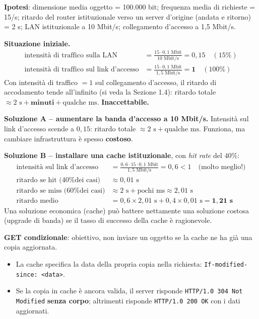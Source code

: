 \documentclass[12pt, a4paper]{article}
\begin{document}
\begin{tcolorbox}[colback=orange!5, colframe=orange!70!black, title=\textbf{Esercizio 2.2 -- Dimensionare l'accesso a Internet con e senza cache}]
\textbf{Ipotesi}: dimensione media oggetto = 100.000 bit; frequenza media di richieste = 15/s; ritardo del router istituzionale verso un server d'origine (andata e ritorno) = 2 s; LAN istituzionale a 10 Mbit/s; collegamento d'accesso a 1,5 Mbit/s.

\textbf{Situazione iniziale.}
\begin{align*}
\text{intensità di traffico sulla LAN} &= \frac{15 \cdot 0{,}1\text{ Mbit}}{10\text{ Mbit/s}} = 0{,}15 \quad (15\%) \\
\text{intensità di traffico sul link d'accesso} &= \frac{15 \cdot 0{,}1\text{ Mbit}}{1{,}5\text{ Mbit/s}} = \mathbf{1} \quad (100\%)
\end{align*}
Con intensità di traffico $=1$ sul collegamento d'accesso, il ritardo di accodamento tende all'infinito (si veda la Sezione 1.4): ritardo totale $\approx 2\text{ s} + \textbf{minuti} + \text{qualche ms}$. \textbf{Inaccettabile.}

\textbf{Soluzione A -- aumentare la banda d'accesso a 10 Mbit/s.} Intensità sul link d'accesso scende a $0{,}15$: ritardo totale $\approx 2\text{ s} + \text{qualche ms}$. Funziona, ma cambiare infrastruttura è spesso \textbf{costoso}.

\textbf{Soluzione B -- installare una cache istituzionale}, con \textit{hit rate} del $40\%$:
\begin{align*}
\text{intensità sul link d'accesso} &= \frac{0{,}6 \cdot 15 \cdot 0{,}1\text{ Mbit}}{1{,}5\text{ Mbit/s}} = 0{,}6 < 1 \quad \text{(molto meglio!)} \\
\text{ritardo se hit (40\% dei casi)} &\approx 0{,}01\text{ s} \\
\text{ritardo se miss (60\% dei casi)} &\approx 2\text{ s} + \text{pochi ms} \approx 2{,}01\text{ s} \\
\text{ritardo medio} &= 0{,}6 \times 2{,}01\text{ s} + 0{,}4 \times 0{,}01\text{ s} = \mathbf{1{,}21\text{ s}}
\end{align*}
Una soluzione economica (cache) può battere nettamente una soluzione costosa (upgrade di banda) se il tasso di successo della cache è ragionevole.
\end{tcolorbox}

\textbf{GET condizionale}: obiettivo, non inviare un oggetto se la cache ne ha già una copia aggiornata.
\begin{itemize}
    \item La cache specifica la data della propria copia nella richiesta: \texttt{If-modified-since: <data>}.
    \item Se la copia in cache è ancora valida, il server risponde \texttt{HTTP/1.0 304 Not Modified} \textbf{senza corpo}; altrimenti risponde \texttt{HTTP/1.0 200 OK} con i dati aggiornati.
\end{itemize}
\end{document}
